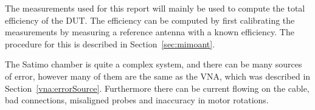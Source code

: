 The measurements used for this report will mainly be used to compute the total efficiency of the DUT.
The efficiency can be computed by first calibrating the measurements by measuring a reference antenna with a known efficiency. The procedure for this is described in Section~\ref{sec:mimoant}.

The Satimo chamber is quite a complex system, and there can be many sources of error, however many of them are the same as the VNA, which was described in Section~\ref{vna:errorSource}. Furthermore there can be current flowing on the cable, bad connections, misaligned probes and inaccuracy in motor rotations. 
